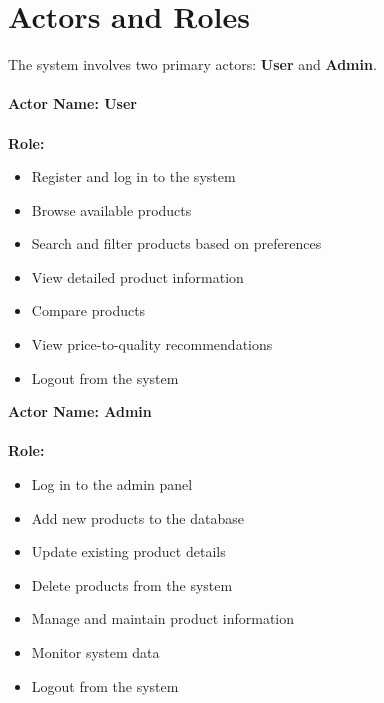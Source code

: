  \section{Actors and Roles}

The system involves two primary actors: \textbf{User} and \textbf{Admin}.\\\\

\noindent
\textbf{Actor Name: User}
\\\\
\textbf{Role:}
\begin{itemize}
    \item Register and log in to the system
    \item Browse available products
    \item Search and filter products based on preferences
    \item View detailed product information
    \item Compare products
    \item View price-to-quality recommendations
    \item Logout from the system
\end{itemize}

\noindent
\textbf{Actor Name: Admin}
\\\\
\textbf{Role:}
\begin{itemize}
    \item Log in to the admin panel
    \item Add new products to the database
    \item Update existing product details
    \item Delete products from the system
    \item Manage and maintain product information
    \item Monitor system data
    \item Logout from the system
\end{itemize}
